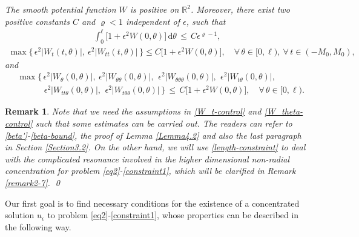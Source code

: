 \documentclass[10pt, reqno]{amsart}
\numberwithin{equation}{section}
\theoremstyle{definition}
\newtheorem{remark}[theorem]{Remark}
\begin{document}
\smallskip
{}
{\it
The smooth potential function $W$ is positive on ${\mathbb R}^2$.
Moreover, there exist two positive constants $C$ and $\varrho<1$ independent of $\epsilon$, such that
\begin{align}
\int_0^{\ell}\big[1+ \epsilon^2 W(0, \theta) \big]\,{\mathrm d}\theta \,\leq\, C\epsilon^{\varrho-1},
\label{length-constraint}
\end{align}
\begin{align}
\max\big\{\, \epsilon^2|W_t (t, \theta)|, \ \epsilon^2|W_{tt} (t, \theta)| \, \big\}
\leq
C \big[1+\epsilon^2 W(0, \theta)\big], \quad \forall\, \theta \in [0, \ell),\ \forall\,t\in(-M_0, M_0),
\label{W_t-control}
\end{align}
and
\begin{align} \label{W_theta-control}
& \max\Big\{\,
\epsilon^2|W_{\theta}(0, \theta)|,\
\epsilon^2|W_{\theta\theta}(0, \theta)|,\
\,\epsilon^2|W_{\theta\theta\theta}(0, \theta)|,\
\, \epsilon^2|W_{t\theta}(0, \theta)|,
\nonumber\\[2mm]
& \quad \quad \quad
\,\epsilon^2|W_{tt\theta}(0, \theta)|,\
\,\epsilon^2|W_{t\theta\theta}(0, \theta)|
\,\Big\}
\,\leq\,
C\big[1+\epsilon^2 W(0, \theta)\big],
\quad \forall\, \theta \in [0, \ell).
\end{align}
}



\smallskip
\begin{remark} \label{remark2-1}
{\emph{
Note that we need the assumptions in \eqref{W_t-control} and \eqref{W_theta-control} such that some estimates can be carried out.
The readers can refer to \eqref{beta'}-\eqref{beta-bound}, the proof of Lemma \ref{Lemma4.2} and also the last paragraph in Section \ref{Section3.2}.
On the other hand, we will use \eqref{length-constraint} to deal with the complicated resonance involved in the higher dimensional non-radial concentration for problem \eqref{eq2}-\eqref{constraint1}, which will be clarified in Remark \ref{remark2-7}.
\qed
}}
\end{remark}


\medskip
Our first goal is to find necessary conditions for the existence of a concentrated solution $u_\epsilon$ to problem \eqref{eq2}-\eqref{constraint1},
whose properties can be described in the following way.
\end{document}
